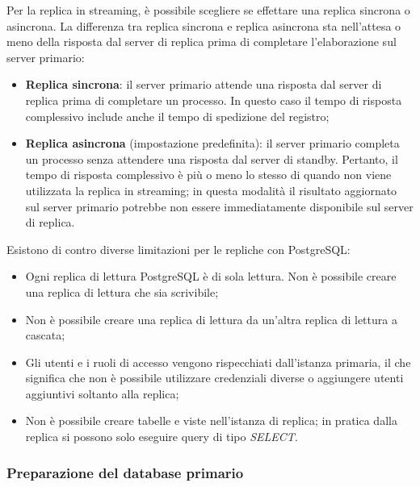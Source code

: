 Per la replica in streaming, è possibile scegliere se effettare una replica sincrona o asincrona. La differenza tra replica sincrona e replica asincrona sta nell'attesa o meno della risposta dal server di replica prima di completare l'elaborazione sul server primario:
\begin{itemize}
  \item \textbf{Replica sincrona}: il server primario attende una risposta dal server di replica prima di completare un processo. In questo caso il tempo di risposta complessivo include anche il tempo di spedizione del registro;
  \item \textbf{Replica asincrona} (impostazione predefinita): il server primario completa un processo senza attendere una risposta dal server di standby. Pertanto, il tempo di risposta complessivo è più o meno lo stesso di quando non viene utilizzata la replica in streaming; in questa modalità il risultato aggiornato sul server primario potrebbe non essere immediatamente disponibile sul server di replica. \cite{streaming_replication}
\end{itemize}

Esistono di contro diverse limitazioni per le repliche con PostgreSQL:
\begin{itemize}
  \item Ogni replica di lettura PostgreSQL è di sola lettura. Non è possibile creare una replica di lettura che sia scrivibile;
  \item Non è possibile creare una replica di lettura da un'altra replica di lettura a cascata;
  \item Gli utenti e i ruoli di accesso vengono rispecchiati dall'istanza primaria, il che significa che non è possibile utilizzare credenziali diverse o aggiungere utenti aggiuntivi soltanto alla replica;
  \item Non è possibile creare tabelle e viste nell'istanza di replica; in pratica dalla replica si possono solo eseguire query di tipo \textit{SELECT}.
\end{itemize}

\subsubsection{Preparazione del database primario}


